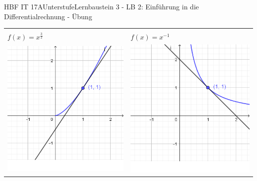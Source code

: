 \documentclass[oneside,openany,headings=optiontotoc,11pt,numbers=noenddot]{scrreprt}
\begin{document}
\begin{worksheet}{HBF IT 17A}{Unterstufe}{Lernbaustein 3 - LB 2: Einführung in die Differentialrechnung - Übung}
\begin{framed}
\begin{center}
\begin{tabularx}{\textwidth}{XX}
					\hline\\
					\(f(x)=x^{\frac{3}{2}}\) & \(f(x) = x^{-1}\)\\
					\includegraphics[scale=0.3]{Bilder/Ct.png} & \includegraphics[scale=0.3]{Bilder/Dt.png}\\

\end{tabularx}
\end{center}
\end{framed}
\end{worksheet}
\end{document}
